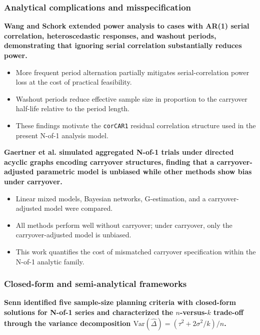 \documentclass[
  11pt,
]{article}
\begin{document}
\subsubsection{Analytical complications and misspecification}\label{analytical-complications-and-misspecification}

\textbf{Wang and Schork extended power analysis to cases with AR(1) serial correlation, heteroscedastic responses, and washout periods, demonstrating that ignoring serial correlation substantially reduces power.}

\begin{itemize}\setlength{\itemsep}{2pt}\setlength{\parskip}{0pt}
\item More frequent period alternation partially mitigates serial-correlation power loss at the cost of practical feasibility.
\item Washout periods reduce effective sample size in proportion to the carryover half-life relative to the period length.
\item These findings motivate the \texttt{corCAR1} residual correlation structure used in the present N-of-1 analysis model.
\end{itemize}

\textbf{Gaertner et al. simulated aggregated N-of-1 trials under directed acyclic graphs encoding carryover structures, finding that a carryover-adjusted parametric model is unbiased while other methods show bias under carryover.}

\begin{itemize}\setlength{\itemsep}{2pt}\setlength{\parskip}{0pt}
\item Linear mixed models, Bayesian networks, G-estimation, and a carryover-adjusted model were compared.
\item All methods perform well without carryover; under carryover, only the carryover-adjusted model is unbiased.
\item This work quantifies the cost of mismatched carryover specification within the N-of-1 analytic family.
\end{itemize}

\subsubsection{Closed-form and semi-analytical frameworks}\label{closed-form-and-semi-analytical-frameworks}

\textbf{Senn identified five sample-size planning criteria with closed-form solutions for N-of-1 series and characterized the $n$-versus-$k$ trade-off through the variance decomposition $\text{Var}(\hat{\Delta}) = (\tau^2 + 2\sigma^2/k)/n$.}
\end{document}
